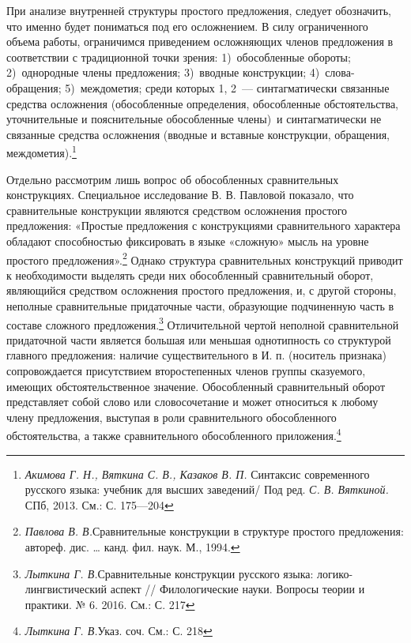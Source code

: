 \documentclass{kursa4}
\begin{document}
      При анализе внутренней структуры простого предложения, следует обозначить, что именно будет пониматься под его осложнением. В силу ограниченного объема работы, ограничимся приведением осложняющих членов предложения в соответствии с традиционной точки зрения: 1)~обособленные обороты; 2)~однородные члены предложения; 3)~вводные конструкции; 4)~слова-обращения; 5)~междометия; среди которых 1, 2~--- синтагматически связанные средства осложнения (обособленные определения, обособленные обстоятельства, уточнительные и пояснительные обособленные члены)~и синтагматически не связанные средства осложнения (вводные и вставные конструкции, обращения, междометия).\footnote{\textit{Акимова Г. Н., Вяткина С. В., Казаков В. П. }Синтаксис современного русского языка: учебник для высших заведений/ Под ред. \textit{С. В. Вяткиной.} СПб, 2013. См.: С. 175—204} 

      Отдельно рассмотрим лишь вопрос об обособленных сравнительных конструкциях. Специальное исследование В. В. Павловой показало, что сравнительные конструкции являются средством осложнения простого предложения: «Простые предложения с конструкциями сравнительного характера обладают способностью фиксировать в языке «сложную» мысль на уровне простого предложения».\footnote{\textit{Павлова В. В.}Сравнительные конструкции в структуре простого предложения: автореф. дис. … канд. фил. наук. М., 1994.} Однако структура сравнительных конструкций приводит к необходимости выделять среди них обособленный сравнительный оборот, являющийся средством осложнения простого предложения, и, с другой стороны, неполные сравнительные придаточные части, образующие подчиненную часть в составе сложного предложения.\footnote{\textit{Лыткина Г. В.}Сравнительные конструкции русского языка: логико-лингвистический аспект // Филологические науки. Вопросы теории и практики. № 6. 2016. См.: С. 217} Отличительной чертой неполной сравнительной придаточной части является большая или меньшая однотипность со структурой главного предложения: наличие существительного в И. п. (носитель признака) сопровождается присутствием второстепенных членов группы сказуемого, имеющих обстоятельственное значение.  Обособленный сравнительный оборот представляет собой слово или словосочетание и может относиться к любому члену предложения, выступая в роли сравнительного обособленного обстоятельства, а также сравнительного обособленного приложения.\footnote{\textit{Лыткина Г. В.}Указ. соч. См.: С. 218} 
\end{document}
